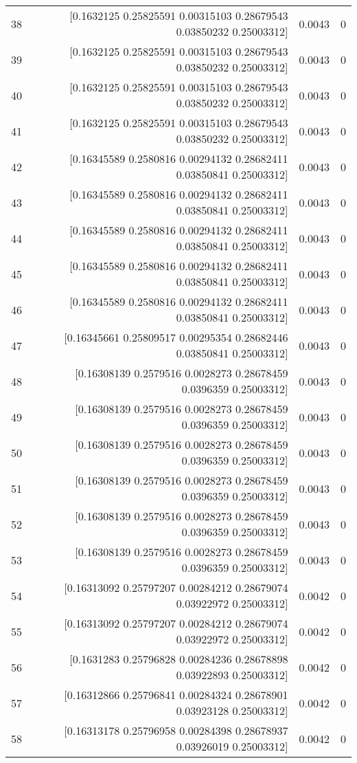 \begin{longtable}{lrrr}
38 & [0.1632125  0.25825591 0.00315103 0.28679543 0.03850232 0.25003312] & 0.0043 & 0 \\
39 & [0.1632125  0.25825591 0.00315103 0.28679543 0.03850232 0.25003312] & 0.0043 & 0 \\
40 & [0.1632125  0.25825591 0.00315103 0.28679543 0.03850232 0.25003312] & 0.0043 & 0 \\
41 & [0.1632125  0.25825591 0.00315103 0.28679543 0.03850232 0.25003312] & 0.0043 & 0 \\
42 & [0.16345589 0.2580816  0.00294132 0.28682411 0.03850841 0.25003312] & 0.0043 & 0 \\
43 & [0.16345589 0.2580816  0.00294132 0.28682411 0.03850841 0.25003312] & 0.0043 & 0 \\
44 & [0.16345589 0.2580816  0.00294132 0.28682411 0.03850841 0.25003312] & 0.0043 & 0 \\
45 & [0.16345589 0.2580816  0.00294132 0.28682411 0.03850841 0.25003312] & 0.0043 & 0 \\
46 & [0.16345589 0.2580816  0.00294132 0.28682411 0.03850841 0.25003312] & 0.0043 & 0 \\
47 & [0.16345661 0.25809517 0.00295354 0.28682446 0.03850841 0.25003312] & 0.0043 & 0 \\
48 & [0.16308139 0.2579516  0.0028273  0.28678459 0.0396359  0.25003312] & 0.0043 & 0 \\
49 & [0.16308139 0.2579516  0.0028273  0.28678459 0.0396359  0.25003312] & 0.0043 & 0 \\
50 & [0.16308139 0.2579516  0.0028273  0.28678459 0.0396359  0.25003312] & 0.0043 & 0 \\
51 & [0.16308139 0.2579516  0.0028273  0.28678459 0.0396359  0.25003312] & 0.0043 & 0 \\
52 & [0.16308139 0.2579516  0.0028273  0.28678459 0.0396359  0.25003312] & 0.0043 & 0 \\
53 & [0.16308139 0.2579516  0.0028273  0.28678459 0.0396359  0.25003312] & 0.0043 & 0 \\
54 & [0.16313092 0.25797207 0.00284212 0.28679074 0.03922972 0.25003312] & 0.0042 & 0 \\
55 & [0.16313092 0.25797207 0.00284212 0.28679074 0.03922972 0.25003312] & 0.0042 & 0 \\
56 & [0.1631283  0.25796828 0.00284236 0.28678898 0.03922893 0.25003312] & 0.0042 & 0 \\
57 & [0.16312866 0.25796841 0.00284324 0.28678901 0.03923128 0.25003312] & 0.0042 & 0 \\
58 & [0.16313178 0.25796958 0.00284398 0.28678937 0.03926019 0.25003312] & 0.0042 & 0 \\

\end{longtable}

